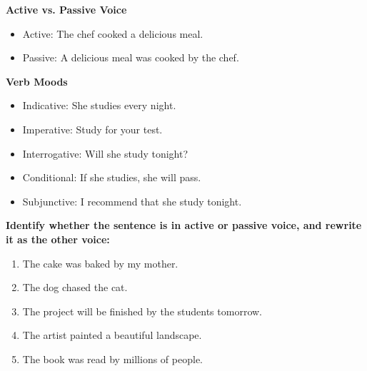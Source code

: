 \documentclass[12pt]{article}
\begin{document}
\vspace{1em}

\begin{tcolorbox}[colframe=black!60, colback=white, 
coltitle=black, colbacktitle=black!15, fonttitle=\bfseries\Large, 
title=Examples, halign title=center, left=10pt, right=10pt, top=10pt, bottom=15pt]

\textbf{Active vs. Passive Voice}
\begin{itemize}
    \item Active: The chef cooked a delicious meal.  
    \item Passive: A delicious meal was cooked by the chef.
\end{itemize}

\textbf{Verb Moods}
\begin{itemize}
    \item Indicative: She studies every night.  
    \item Imperative: Study for your test.  
    \item Interrogative: Will she study tonight?  
    \item Conditional: If she studies, she will pass.  
    \item Subjunctive: I recommend that she study tonight.
\end{itemize}

\end{tcolorbox}

\vspace{1em}

\begin{tcolorbox}[colframe=black!60, colback=white, 
coltitle=black, colbacktitle=black!15, fonttitle=\bfseries\Large, 
title=Guided Practice, halign title=center, left=10pt, right=10pt, top=10pt, bottom=15pt]
\textbf{Identify whether the sentence is in active or passive voice, and rewrite it as the other voice:}
\begin{enumerate}[itemsep=3em]
    \item The cake was baked by my mother.  
    \item The dog chased the cat.  
    \item The project will be finished by the students tomorrow.  
    \item The artist painted a beautiful landscape.  
    \item The book was read by millions of people.
\end{enumerate}
\end{tcolorbox}
\end{document}
